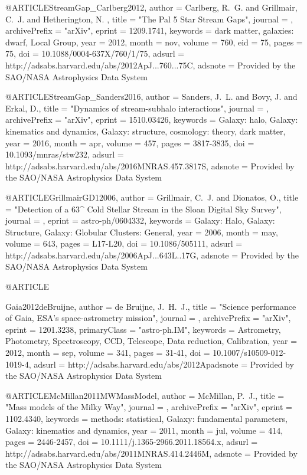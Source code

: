 \documentclass[apj]{emulateapj}
\def\deg{^\circ}
\begin{document}
{{{{{{{{{{{@ARTICLE{StreamGap_Carlberg2012,
   author = {{Carlberg}, R.~G. and {Grillmair}, C.~J. and {Hetherington}, N.
	},
    title = "{The Pal 5 Star Stream Gaps}",
  journal = {\apj},
archivePrefix = "arXiv",
   eprint = {1209.1741},
 keywords = {dark matter, galaxies: dwarf, Local Group},
     year = 2012,
    month = nov,
   volume = 760,
      eid = {75},
    pages = {75},
      doi = {10.1088/0004-637X/760/1/75},
   adsurl = {http://adsabs.harvard.edu/abs/2012ApJ...760...75C},
  adsnote = {Provided by the SAO/NASA Astrophysics Data System}
}

@ARTICLE{StreamGap_Sanders2016,
   author = {{Sanders}, J.~L. and {Bovy}, J. and {Erkal}, D.},
    title = "{Dynamics of stream-subhalo interactions}",
  journal = {\mnras},
archivePrefix = "arXiv",
   eprint = {1510.03426},
 keywords = {Galaxy: halo, Galaxy: kinematics and dynamics, Galaxy: structure, cosmology: theory, dark matter},
     year = 2016,
    month = apr,
   volume = 457,
    pages = {3817-3835},
      doi = {10.1093/mnras/stw232},
   adsurl = {http://adsabs.harvard.edu/abs/2016MNRAS.457.3817S},
  adsnote = {Provided by the SAO/NASA Astrophysics Data System}
}



@ARTICLE{GrillmairGD12006,
   author = {{Grillmair}, C.~J. and {Dionatos}, O.},
    title = "{Detection of a 63{\deg} Cold Stellar Stream in the Sloan Digital Sky Survey}",
  journal = {\apjl},
   eprint = {astro-ph/0604332},
 keywords = {Galaxy: Halo, Galaxy: Structure, Galaxy: Globular Clusters: General},
     year = 2006,
    month = may,
   volume = 643,
    pages = {L17-L20},
      doi = {10.1086/505111},
   adsurl = {http://adsabs.harvard.edu/abs/2006ApJ...643L..17G},
  adsnote = {Provided by the SAO/NASA Astrophysics Data System}
}


@ARTICLE{Gaia2012deBruijne,
   author = {{de Bruijne}, J.~H.~J.},
    title = "{Science performance of Gaia, ESA's space-astrometry mission}",
  journal = {\apss},
archivePrefix = "arXiv",
   eprint = {1201.3238},
 primaryClass = "astro-ph.IM",
 keywords = {Astrometry, Photometry, Spectroscopy, CCD, Telescope, Data reduction, Calibration},
     year = 2012,
    month = sep,
   volume = 341,
    pages = {31-41},
      doi = {10.1007/s10509-012-1019-4},
   adsurl = {http://adsabs.harvard.edu/abs/2012Apadsnote = {Provided by the SAO/NASA Astrophysics Data System}
}



@ARTICLE{McMillan2011MWMassModel,
   author = {{McMillan}, P.~J.},
    title = "{Mass models of the Milky Way}",
  journal = {\mnras},
archivePrefix = "arXiv",
   eprint = {1102.4340},
 keywords = {methods: statistical, Galaxy: fundamental parameters, Galaxy: kinematics and dynamics},
     year = 2011,
    month = jul,
   volume = 414,
    pages = {2446-2457},
      doi = {10.1111/j.1365-2966.2011.18564.x},
   adsurl = {http://adsabs.harvard.edu/abs/2011MNRAS.414.2446M},
  adsnote = {Provided by the SAO/NASA Astrophysics Data System}
}



}}}}}}}}}}}}
\end{document}
